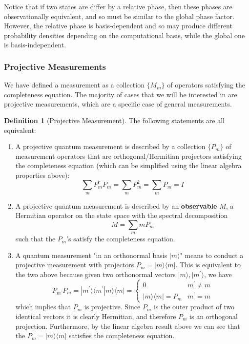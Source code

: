 \documentclass{article}
\theoremstyle{definition}
\newtheorem{definition}{Definition}[section]
\begin{document}
      Notice that if two states are differ by a relative phase, then these phases are observationally equivalent, and so must be similar to the global phase factor. However, the relative phase is basis-dependent and so may produce different probability densities depending on the computational basis, while the global one is basis-independent. 

    \subsubsection{Projective Measurements}

      We have defined a measurement as a collection $\{ M_m\}$ of operators satisfying the completeness equation. The majority of cases that we will be interested in are projective measurements, which are a specific case of general measurements. 

      \begin{definition}[Projective Measurement]
        The following statements are all equivalent:

        \begin{enumerate}
          \item A projective quantum measurement is described by a collection $\{P_m\}$ of measurement operators that are orthogonal/Hermitian projectors satisfying the completeness equation (which can be simplified using the linear algebra properties above):
            \[\sum_m P_m^\dagger P_m = \sum_m P_m^2 = \sum_m P_m = I\]
          \item A projective quantum measurement is described by an \textbf{observable} $M$, a Hermitian operator on the state space with the spectral decomposition
            \[M = \sum_m m P_m\]
          such that the $P_m$'s satisfy the completeness equation.
          \item A quantum measurement "in an orthonormal basis $|m\rangle$" means to conduct a projective measurement with projectors $P_m = |m \rangle \langle m |$. This is equivalent to the two above because given two orthonormal vectors $|m\rangle, |m^\prime \rangle$, we have
            \[P_{m^\prime} P_m = |m^\prime \rangle \langle m^\prime | m \rangle \langle m | = \begin{cases} 0 & m^\prime \neq m \\ |m \rangle \langle m | = P_m & m^\prime = m \end{cases}\]
          which implies that $P_m$ is projective. Since $P_m$ is the outer product of two identical vectors it is clearly Hermitian, and therefore $P_m$ is an orthogonal projection. Furthermore, by the linear algebra result above we can see that the $P_m = |m\rangle \langle m|$ satisfies the completeness equation.
        \end{enumerate}
      \end{definition}
\end{document}
